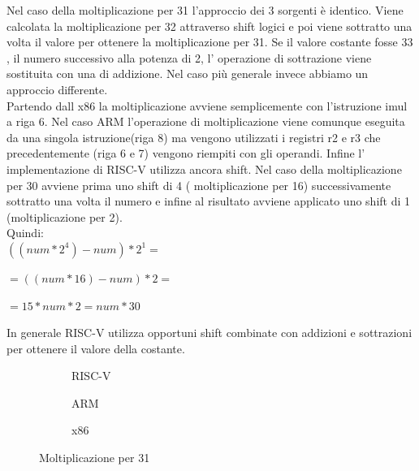 \documentclass[12pt,a4paper]{report}
\begin{document}
\vspace{0.3 cm}

Nel caso della moltiplicazione per 31 l'approccio dei 3 sorgenti è identico. Viene calcolata la moltiplicazione per 32 attraverso shift logici e poi viene sottratto una volta il valore per ottenere la moltiplicazione per 31. Se il valore costante fosse 33 , il numero successivo alla potenza di 2, l' operazione di sottrazione viene sostituita con una di addizione. Nel caso più generale invece abbiamo un approccio differente.\\
Partendo dall x86 la moltiplicazione avviene semplicemente con l'istruzione imul a riga 6.  Nel caso ARM l'operazione di moltiplicazione viene comunque eseguita da una singola istruzione(riga 8) ma vengono utilizzati i registri r2 e r3 che precedentemente (riga 6 e 7) vengono riempiti con gli operandi. Infine l' implementazione di RISC-V utilizza ancora shift. Nel caso della moltiplicazione per 30 avviene prima uno shift di 4 ( moltiplicazione per 16) successivamente sottratto una volta il numero e infine al risultato avviene applicato uno shift di 1 (moltiplicazione per 2). \\ Quindi: \\ 
$((num * 2^4) - num ) * 2^1 = $ 

$ =((num * 16 ) - num ) * 2 =$ 

$ = 15 * num * 2 =  num *30 $ 

\vspace{0.2 cm}
In generale RISC-V utilizza opportuni shift combinate con addizioni e sottrazioni per ottenere il valore della costante.

\begin{figure}[h]

     \begin{subfigure}[b]{0.3\textwidth}
  
        
        \label{Code:Mul31RISC}
	\caption{RISC-V}

     \end{subfigure}
     \hfill
     \begin{subfigure}[b]{0.3\textwidth}
         
          	
		\caption{ARM}
		 \label{Code:Mul31ARM}
     \end{subfigure}
     \hfill
     \begin{subfigure}[b]{0.3\textwidth}
         
          
	 \caption{x86}
	 \label{Code:Mul31X86}
     \end{subfigure}
     \caption{Moltiplicazione per 31}
     \end{figure}
\end{document}
